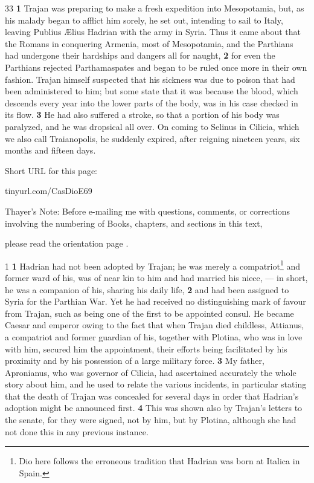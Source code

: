 33
\textbf{1} Trajan was preparing to make a fresh expedition into Mesopotamia, but, as his malady began to afflict him sorely, he set out, intending to sail to Italy, leaving Publius Ælius Hadrian with the army in Syria. Thus it came about that the Romans in conquering Armenia, most of Mesopotamia, and the Parthians had undergone their hardships and dangers all for naught, \textbf{2} for even the Parthians rejected Parthamaspates and began to be ruled once more in their own fashion. Trajan himself suspected that his sickness was due to poison that had been administered to him; but some state that it was because the blood, which descends every year into the lower parts of the body, was in his case checked in its flow. \textbf{3} He had also suffered a stroke, so that a portion of his body was paralyzed, and he was dropsical all over. On coming to Selinus in Cilicia, which we also call Traianopolis, he suddenly expired, after reigning nineteen years, six months and fifteen days.


Short URL for this page:

tinyurl.com/CasDioE69

Thayer's Note: Before e-mailing me with questions, comments, or corrections involving the numbering of Books, chapters, and sections in this text,

please read the orientation page .

1 \textbf{1} Hadrian had not been adopted by Trajan; he was merely a compatriot\texthebrew{⁠}\footnote{Dio here follows the erroneous tradition that Hadrian was born at Italica in Spain.

} and former ward of his, was of near kin to him and had married his niece, \texthebrew{—} in short, he was a companion of his, sharing his daily life, \textbf{2} and had been assigned to Syria for the Parthian War. Yet he had received no distinguishing mark of favour from Trajan, such as being one of the first to be appointed consul. He became Caesar and emperor owing to the fact that when Trajan died childless, Attianus, a compatriot and former guardian of his, together with Plotina, who was in love with him, secured him the appointment, their efforts being facilitated by his proximity and by his possession of a large military force. \textbf{3} My father, Apronianus, who was governor of Cilicia, had ascertained accurately the whole story about him, and he used to relate the various incidents, in particular stating that the death of Trajan was concealed for several days in order that Hadrian's adoption might be announced first. \textbf{4} This was shown also by Trajan's letters to the senate, for they were signed, not by him, but by Plotina, although she had not done this in any previous instance.

